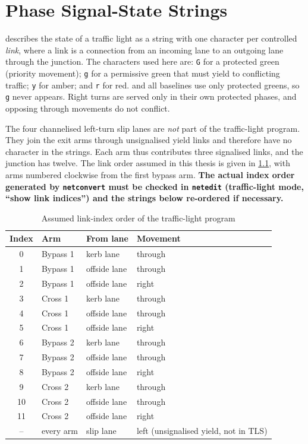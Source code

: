 \chapter{Phase Signal-State Strings}\label{app:phases}

\sumo{} describes the state of a traffic light as a string with one character per controlled
\emph{link}, where a link is a connection from an incoming lane to an outgoing lane through the
junction. The characters used here are: \texttt{G} for a protected green (priority movement);
\texttt{g} for a permissive green that must yield to conflicting traffic; \texttt{y} for amber; and
\texttt{r} for red. \prism{} and all baselines use only protected greens, so \texttt{g} never
appears. Right turns are served only in their own protected phases, and opposing through movements
do not conflict.

The four channelised left-turn slip lanes are \emph{not} part of the traffic-light program. They join
the exit arms through unsignalised yield links and therefore have no character in the strings. Each
arm thus contributes three signalised links, and the junction has twelve. The link order assumed in
this thesis is given in \cref{tab:app-links}, with arms numbered clockwise from the first bypass
arm. \textbf{The actual index order generated by \texttt{netconvert} must be checked in
\texttt{netedit} (traffic-light mode, ``show link indices'') and the strings below re-ordered if
necessary.}

\begin{table}[htbp]
\centering
\caption{Assumed link-index order of the traffic-light program}\label{tab:app-links}
\small
\begin{tabular}{@{}clll@{}}
\toprule
Index & Arm & From lane & Movement\\
\midrule
0 & Bypass 1 & kerb lane & through\\
1 & Bypass 1 & offside lane & through\\
2 & Bypass 1 & offside lane & right\\
3 & Cross 1 & kerb lane & through\\
4 & Cross 1 & offside lane & through\\
5 & Cross 1 & offside lane & right\\
6 & Bypass 2 & kerb lane & through\\
7 & Bypass 2 & offside lane & through\\
8 & Bypass 2 & offside lane & right\\
9 & Cross 2 & kerb lane & through\\
10 & Cross 2 & offside lane & through\\
11 & Cross 2 & offside lane & right\\
\midrule
-- & every arm & slip lane & left (unsignalised yield, not in TLS)\\
\bottomrule
\end{tabular}
\end{table}

